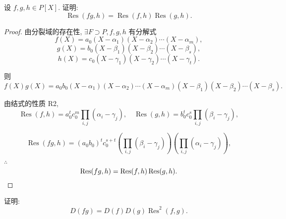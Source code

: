 \documentclass[UTF8]{ctexart}
\begin{document}
\begin{exercise}\label{ex2.5}
    设 $f,g,h\in P[X]$. 证明:
    \[\operatorname{Res}(fg,h)=\operatorname{Res}(f,h)\operatorname{Res}(g,h).\]
\end{exercise}
\begin{proof}
    由分裂域的存在性, $\exists F\supset P,f,g,h$ 有分解式
    \[f(X)=a_0(X-\alpha_1)(X-\alpha_2)\cdots(X-\alpha_m),\]
    \[g(X)=b_0(X-\beta_1)(X-\beta_2)\cdots(X-\beta_s),\]
    \[h(X)=c_0(X-\gamma_1)(X-\gamma_2)\cdots(X-\gamma_t).\]

    则
    \[f(X)g(X)=a_0b_0(X-\alpha_1)(X-\alpha_2)\cdots(X-\alpha_m)(X-\beta_1)(X-\beta_2)\cdots(X-\beta_s).\]

    由结式的性质 R2,
    \[\operatorname{Res}(f,h)=a_0^tc_0^m\prod\limits_{i,j}(\alpha_i-\gamma_j),\quad\operatorname{Res}(g,h)=b_0^tc_0^s\prod\limits_{i,j}(\beta_i-\gamma_j),\]
    
    \[\operatorname{Res}(fg,h)=(a_0b_0)^tc_0^{s+t}\left(\prod\limits_{i,j}(\beta_i-\gamma_j)\right)\left(\prod\limits_{i,j}(\alpha_i-\gamma_j)\right),\]

    $\therefore$
    \[\operatorname{Res}(fg,h)=\operatorname{Res}(f,h)\operatorname{Res}(g,h).\qedhere\]
\end{proof}
\begin{exercise}%
    证明:
    \[D(fg)=D(f)D(g)\operatorname{Res}^2(f,g).\]
\end{exercise}
\end{document}
